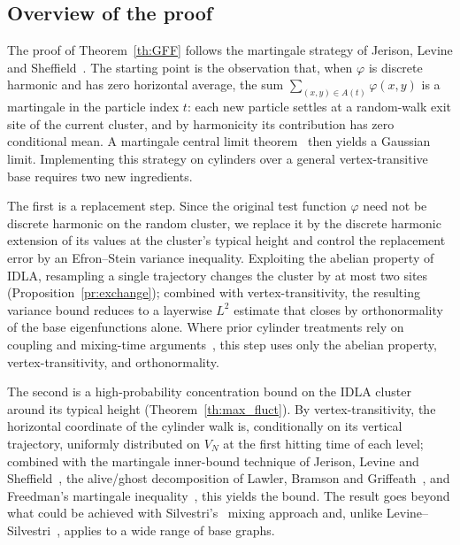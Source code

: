 \documentclass[11pt,a4paper,reqno]{amsart}
\theoremstyle{definition}
\begin{document}
\subsection{Overview of the proof}
The proof of Theorem~\ref{th:GFF} follows the martingale strategy of Jerison, Levine and Sheffield~\cite{jerison2014internal, jerison2014internal2}. The starting point is the observation that, when $\varphi$ is discrete harmonic and has zero horizontal average, the sum $\sum_{(x, y) \in A(t)} \varphi(x, y)$ is a martingale in the particle index $t$: each new particle settles at a random-walk exit site of the current cluster, and by harmonicity its contribution has zero conditional mean. A martingale central limit theorem~\cite{mcleish1974dependent} then yields a Gaussian limit. Implementing this strategy on cylinders over a general vertex-transitive base requires two new ingredients.

The first is a replacement step. Since the original test function $\varphi$ need not be discrete harmonic on the random cluster, we replace it by the discrete harmonic extension of its values
at the cluster's typical height and control the replacement error by an Efron--Stein variance inequality. Exploiting the abelian property of IDLA, resampling a single trajectory changes the cluster by at most two sites (Proposition~\ref{pr:exchange}); combined with vertex-transitivity, the resulting variance bound reduces to a layerwise $L^2$ estimate that closes by orthonormality of the base eigenfunctions alone. Where prior cylinder treatments rely on coupling and mixing-time arguments~\cite{jerison2014internal2, levine2018long, silvestri2020internal}, this step uses only the abelian property, vertex-transitivity, and orthonormality.

The second is a high-probability concentration bound on the IDLA cluster around its typical height (Theorem~\ref{th:max_fluct}). By vertex-transitivity, the horizontal coordinate of the cylinder walk is, conditionally on its vertical trajectory, uniformly distributed on $V_N$ at the first hitting time of each level; combined with the martingale inner-bound technique of Jerison, Levine and Sheffield~\cite{jerison2012logarithmic}, the alive/ghost decomposition of Lawler, Bramson and Griffeath~\cite{lawler1992internal}, and Freedman's martingale inequality~\cite{freedman1975tail}, this yields the bound. The result goes beyond what could be achieved with Silvestri's~\cite{silvestri2020internal} mixing approach and, unlike Levine--Silvestri~\cite{levine2018long}, applies to a wide range of base graphs. 
\end{document}
